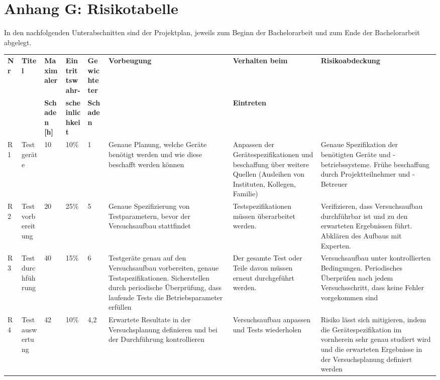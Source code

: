 \chapter{Anhang G: Risikotabelle}
In den nachfolgenden Unterabschnitten sind der Projektplan, jeweils zum Beginn 
der Bachelorarbeit und zum Ende der Bachelorarbeit abgelegt.
\begin{landscape}
\begin{table}[h!]
    \tiny  
	\centering
	\begin{tabularx}{\linewidth}{l l l l l X X X}
        \toprule 
        \multirow{2}{*}{\textbf{Nr}} & \multirow{2}{*}{\textbf{Titel}} & \textbf{Maximaler} & \textbf{Eintrittswahr-} & \textbf{Gewichteter}   & \multirow{2}{*}{\textbf{Vorbeugung}} & \textbf{Verhalten beim}  & \multirow{2}{*}{\textbf{Risikoabdeckung }}\\
        & & \textbf{Schaden [h]} & \textbf{scheinlichkeit} & \textbf{Schaden} & & \textbf{Eintreten}  & \\
        \midrule 
        R1 & Testgeräte & 10 & 10\% & 1 & Genaue Planung, welche Geräte benötigt werden und wie diese beschafft werden können & Anpassen der Gerätespezifikationen und beschaffung über weitere Quellen (Ausleihen von Instituten, Kollegen, Familie) & Genaue Spezifikation der benötigten Geräte und -betriebssysteme. Frühe beschaffung durch Projektteilnehmer und -Betreuer \\ 
        \midrule 
        R2 & Testvorbereitung & 20 & 25\% & 5 & Genaue Spezifizierung von Testparametern, bevor der Versuchsaufbau stattfindet & Testspezifikationen müssen überarbeitet werden. & Verifizieren, dass Versuchsaufbau durchführbar ist und zu den erwarteten Ergebnissen führt. Abklären des Aufbaus mit Experten. \\ 
        \midrule 
        R3 & Testdurchführung & 40 & 15\% & 6 & Testgeräte genau auf den Versuchsaufbau vorbereiten, genaue Testspezifikationen. Sicherstellen durch periodische Überprüfung, dass laufende Tests die Betriebsparameter erfüllen & Der gesamte Test oder Teile davon müssen erneut durchgeführt werden. & Versuchsaufbau unter kontrollierten Bedingungen. Periodisches Überprüfen nach jedem Versuchsschritt, dass keine Fehler vorgekommen sind \\ 
        \midrule 
        R4 & Testauswertung  & 42 & 10\% & 4,2 & Erwartete Resultate in der Versuchsplanung definieren und bei der Durchführung kontrollieren & Versuchsaufbau anpassen und Tests wiederholen & Risiko lässt sich mitigieren, indem die Gerätespezifikation im vornherein sehr genau studiert wird und die erwarteten Ergebnisse in der Versuchsplanung definiert werden \\ 

\end{tabularx}
\end{table}
\end{landscape}
